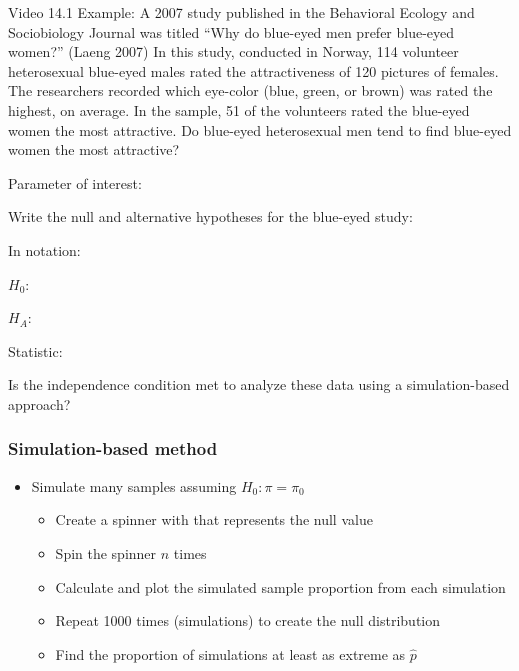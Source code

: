 \documentclass[
]{report}
\begin{document}
Video 14.1 Example: A 2007 study published in the Behavioral Ecology and Sociobiology Journal was titled ``Why do blue-eyed men prefer blue-eyed women?'' (Laeng 2007) In this study, conducted in Norway, 114 volunteer heterosexual blue-eyed males rated the attractiveness of 120 pictures of females. The researchers recorded which eye-color (blue, green, or brown) was rated the highest, on average. In the sample, 51 of the volunteers rated the blue-eyed women the most attractive. Do blue-eyed heterosexual men tend to find blue-eyed women the most attractive?

Parameter of interest:

\vspace{0.5in}

Write the null and alternative hypotheses for the blue-eyed study:

In notation:

\vspace{1mm}

\(H_0:\)

\vspace{0.2in}

\(H_A:\)

\vspace{0.2in}

Statistic:

\vspace{0.4in}

Is the independence condition met to analyze these data using a simulation-based approach?

\vspace{0.2in}

\newpage

\subsubsection*{Simulation-based method}\label{simulation-based-method-1}

\begin{itemize}
\item
  Simulate many samples assuming \(H_0: \pi = \pi_0\)

  \begin{itemize}
  \item
    Create a spinner with that represents the null value
  \item
    Spin the spinner \(n\) times
  \item
    Calculate and plot the simulated sample proportion from each simulation
  \item
    Repeat 1000 times (simulations) to create the null distribution
  \item
    Find the proportion of simulations at least as extreme as \(\hat{p}\)
  \end{itemize}
\end{itemize}
\end{document}
